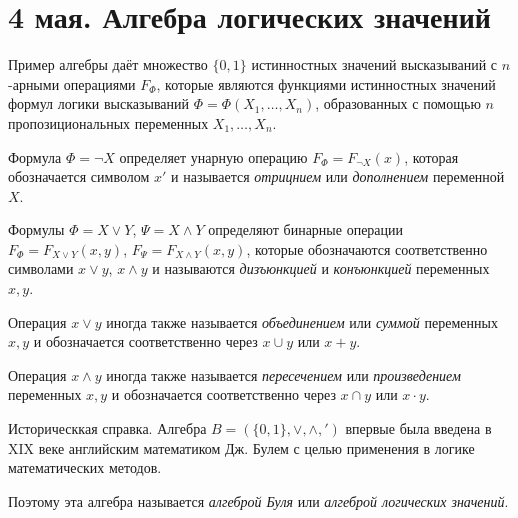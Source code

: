 \chapter{4 мая. Алгебра логических значений}

Пример алгебры даёт множество $\{0,1\}$ истинностных значений высказываний с $n$-арными операциями $F_\Phi$, которые являются функциями истинностных значений формул логики высказываний $\Phi=\Phi(X_1,\dots,X_n)$, образованных с помощью $n$ пропозициональных переменных $X_1, \dots, X_n$.

Формула $\Phi = \neg X$ определяет унарную операцию $F_\Phi = F_{\neg X}(x)$, которая обозначается символом $x'$ и называется \textit{отрицнием} или \textit{дополнением} переменной $X$.

Формулы $\Phi = X \lor Y$, $\Psi = X \land Y$ определяют бинарные операции $F_\Phi = F_{X \lor Y}(x, y)$, $F_\Psi = F_{X \land Y}(x, y)$, которые обозначаются соответственно символами $x \lor y$, $x \land y$ и называются \textit{дизъюнкцией} и \textit{конъюнкцией} переменных $x, y$.

Операция $x \lor y$ иногда также называется \textit{объединением} или \textit{суммой} переменных $x, y$ и обозначается соответственно через $x \cup y$ или $x + y$.

Операция $x \land y$ иногда также называется \textit{пересечением} или \textit{произведением} переменных $x, y$ и обозначается соответственно через $x \cap y$ или $x \cdot y$.

Историческкая справка. Алгебра $B=(\{0,1\},\lor,\land,')$ впервые была введена в XIX веке английским математиком Дж. Булем с целью применения в логике математических методов.

Поэтому эта алгебра называется \textit{алгеброй Буля} или \textit{алгеброй логических значений}.

